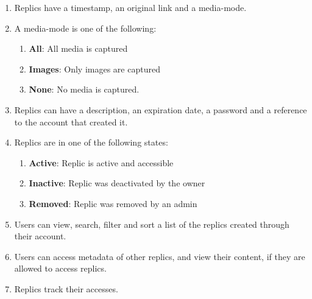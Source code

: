 \begin{enumerate}[label=\textit{AC \arabic*}, resume]
    \item \label{ac:replics:1} Replics have a timestamp, an original link and a media-mode.
    \item \label{ac:replics:2} A media-mode is one of the following: \begin{enumerate}
                                                                         \item \textbf{All}: All media is captured
                                                                         \item \textbf{Images}: Only images are captured
                                                                         \item \textbf{None}: No media is captured.
    \end{enumerate}
    \item \label{ac:replics:3} Replics can have a description, an expiration date, a password and a reference to the account that created it.
    \item \label{ac:replics:4} Replics are in one of the following states: \begin{enumerate}
                                                                               \item \textbf{Active}: Replic is active and accessible
                                                                               \item \textbf{Inactive}: Replic was deactivated by the owner
                                                                               \item \textbf{Removed}: Replic was removed by an admin
    \end{enumerate}
    \item \label{ac:replics:5} Users can view, search, filter and sort a list of the replics created through their account.
    \item \label{ac:replics:6} Users can access metadata of other replics, and view their content, if they are allowed to access replics.
    \item \label{ac:replics:7} Replics track their accesses.
\end{enumerate}

